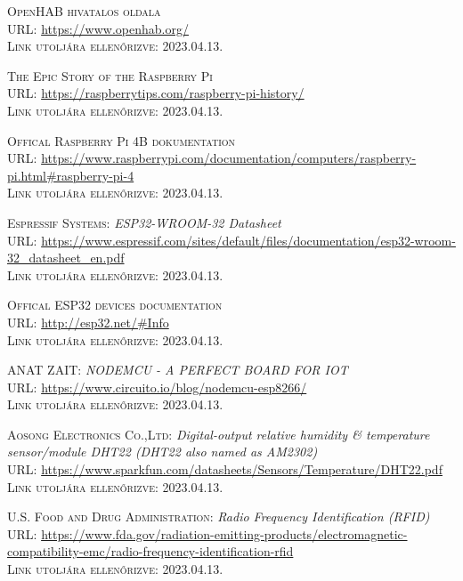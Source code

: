 \documentclass[
]{thesis-ekf}
\theoremstyle{definition}
\theoremstyle{remark}
\begin{document}
\begin{thebibliography}{46}
		\textsc{OpenHAB hivatalos oldala}\\
		\textsc{URL:} \url{https://www.openhab.org/}\\
		\textsc{Link utoljára ellenőrizve:} 2023.04.13.
		
		\textsc{The Epic Story of the Raspberry Pi}\\
		\textsc{URL:} \url{https://raspberrytips.com/raspberry-pi-history/}\\
		\textsc{Link utoljára ellenőrizve:} 2023.04.13.
		
		\textsc{Offical Raspberry Pi 4B dokumentation}\\
		\textsc{URL:} \url{https://www.raspberrypi.com/documentation/computers/raspberry-pi.html#raspberry-pi-4}\\
		\textsc{Link utoljára ellenőrizve:} 2023.04.13.
		
		\textsc{Espressif Systems:} \emph{ESP32­-WROOM-­32 Datasheet}\\
		\textsc{URL:} \url{https://www.espressif.com/sites/default/files/documentation/esp32-wroom-32_datasheet_en.pdf}\\
		\textsc{Link utoljára ellenőrizve:} 2023.04.13.
		
		\textsc{Offical ESP32 devices documentation}\\
		\textsc{URL:} \url{http://esp32.net/#Info}\\
		\textsc{Link utoljára ellenőrizve:} 2023.04.13.
		
		\textsc{ANAT ZAIT:} \emph{NODEMCU - A PERFECT BOARD FOR IOT}\\
		\textsc{URL:} \url{https://www.circuito.io/blog/nodemcu-esp8266/}\\
		\textsc{Link utoljára ellenőrizve:} 2023.04.13.
		
		\textsc{Aosong Electronics Co.,Ltd:} \emph{Digital-output relative humidity \& temperature sensor/module DHT22 (DHT22 also named as AM2302)}\\
		\textsc{URL:} \url{https://www.sparkfun.com/datasheets/Sensors/Temperature/DHT22.pdf}\\
		\textsc{Link utoljára ellenőrizve:} 2023.04.13.
		
		\textsc{U.S. Food and Drug Administration:} \emph{Radio Frequency Identification (RFID)}\\
		\textsc{URL:} \url{https://www.fda.gov/radiation-emitting-products/electromagnetic-compatibility-emc/radio-frequency-identification-rfid}\\
		\textsc{Link utoljára ellenőrizve:} 2023.04.13.
		

\end{thebibliography}
\end{document}
